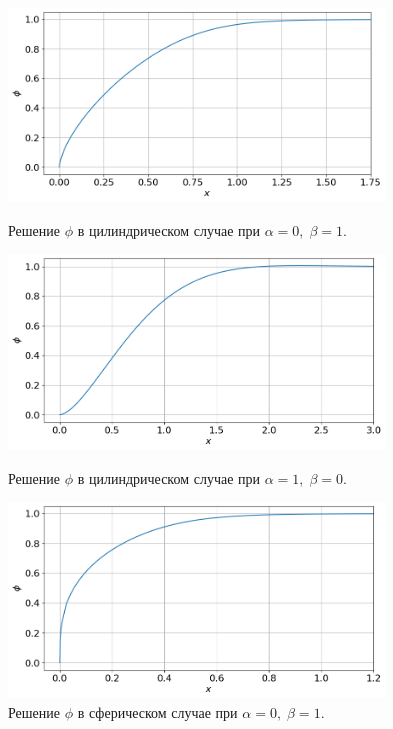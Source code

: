 \begin{figure}[!tp]
    \centering
    \includegraphics[width=0.89\textwidth]{figures/result_volumes_cyl_p.png}
    \vspace{-0.3cm}
    \caption{Решение $\phi$ в цилиндрическом случае при $\alpha = 0, \; \beta = 1$.}
    \label{fig:result_volumes_cyl_p}
    \vspace{0.5cm}

    \includegraphics[width=0.89\textwidth]{figures/result_volumes_cyl_bi.png}
    \vspace{-0.3cm}
    \caption{Решение $\phi$ в цилиндрическом случае при $\alpha = 1, \; \beta = 0$.}
    \label{fig:result_volumes_cyl_bi}
    \vspace{0.5cm}
    
    \includegraphics[width=0.89\textwidth]{figures/result_volumes_sph_p.png}
    \vspace{-0.3cm}
    \caption{Решение $\phi$ в сферическом случае при $\alpha = 0, \; \beta = 1$.}
    \label{fig:result_volumes_sph_p}
\end{figure}

